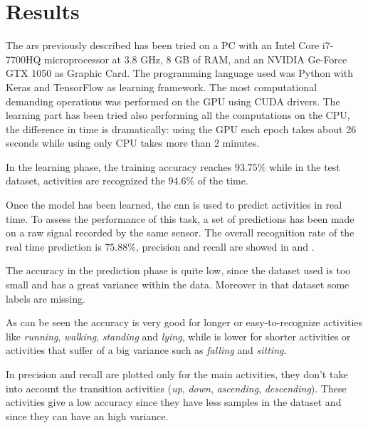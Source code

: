 
\section{Results}
\label{sec:results}

The \gls{ars} previously described has been tried on a PC with an Intel Core i7-7700HQ microprocessor at 3.8 GHz, 8 GB of RAM, and an NVIDIA Ge-Force GTX 1050 as Graphic Card. The programming language used was Python with Keras and TensorFlow as learning framework. The most computational demanding operations was performed on the GPU using CUDA drivers.
The learning part has been tried also performing all the computations on the CPU, the difference in time is dramatically: using the GPU each epoch takes about 26 seconds while using only CPU takes more than 2 minutes.

In the learning phase, the training accuracy reaches $93.75\%$ while in the test dataset, activities are recognized the $94.6\%$ of the time.

Once the model has been learned, the \gls{cnn} is used to predict activities in real time. To assess the performance of this task, a set of predictions has been made on a raw signal recorded by the same sensor. The overall recognition rate of the real time prediction is $75.88\%$, precision and recall are showed in  and .

The accuracy in the prediction phase is quite low, since the dataset used is too small and has a great variance within the data. Moreover in that dataset some labels are missing.

As can be seen the accuracy is very good for longer or easy-to-recognize activities like \textit{running}, \textit{walking}, \textit{standing} and \textit{lying}, while is lower for shorter activities or activities that suffer of a big variance such as \textit{falling} and \textit{sitting}.

In \cite{Korbinian} precision and recall are plotted only for the main activities, they don't take into account the transition activities (\textit{up}, \textit{down}, \textit{ascending}, \textit{descending}). These activities give a low accuracy since they have less samples in the dataset and since they can have an high variance.

